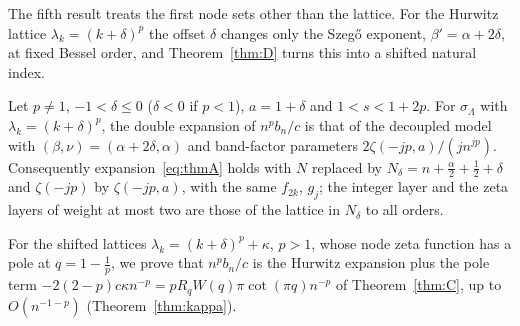 The fifth result treats the first node sets other than the lattice. For the Hurwitz lattice $\lambda_k=(k+\delta)^p$ the offset
$\delta$ changes only the Szeg\H{o} exponent, $\beta'=\alpha+2\delta$, at fixed Bessel order, and Theorem~\ref{thm:D} turns this into a
shifted natural index.

\begin{mainthm}\label{thm:E}
Let $p\ne1$, $-1<\delta\le0$ ($\delta<0$ if $p<1$), $a=1+\delta$ and $1<s<1+2p$. For $\sigma_\Lambda$ with $\lambda_k=(k+\delta)^p$, the
double expansion of $n^pb_n/c$ is that of the decoupled model with $(\beta,\nu)=(\alpha+2\delta,\alpha)$ and band-factor parameters
$2\zeta(-jp,a)/(jn^{jp})$. Consequently expansion~\eqref{eq:thmA} holds with $N$ replaced by $N_\delta=n+\frac\alpha2+\frac12+\delta$ and
$\zeta(-jp)$ by $\zeta(-jp,a)$, with the same $f_{2k}$, $g_j$; the integer layer and the zeta layers of weight at most two are those of
the lattice in $N_\delta$ to all orders.
\end{mainthm}

For the shifted lattices $\lambda_k=(k+\delta)^p+\kappa$, $p>1$, whose node zeta function has a pole at $q=1-\frac1p$, we prove that
$n^pb_n/c$ is the Hurwitz expansion plus the pole term $-2(2-p)c\kappa n^{-p}=pR_qW(q)\pi\cot(\pi q)n^{-p}$ of Theorem~\ref{thm:C}, up
to $O(n^{-1-p})$ (Theorem~\ref{thm:kappa}).

